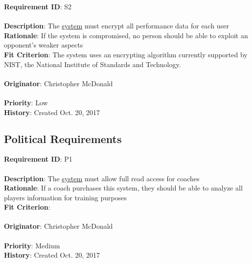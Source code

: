 \documentclass[11pt]{article}
\begin{document}
\begin{framed}
	\noindent\textbf{Requirement ID}: S2 \hfill\\\\
	\noindent\textbf{Description}: The \hyperref[sec:definitions]{system} must encrypt all performance data for each user \\
	\textbf{Rationale}: If the system is compromised, no person should be able to exploit an opponent's weaker aspects \\
	\textbf{Fit Criterion}: The system uses an encrypting algorithm currently supported by NIST, the National Institute of Standards and Technology.\\\\
	\textbf{Originator}: Christopher McDonald \\\\
	\textbf{Priority}: Low \hfill \\
	\noindent\textbf{History}: Created Oct. 20, 2017
\end{framed}

\subsection{Political Requirements}
\begin{framed}
	\noindent\textbf{Requirement ID}: P1\\\\
	\noindent\textbf{Description}: The \hyperref[sec:definitions]{system} must allow full read access for coaches \\
	\textbf{Rationale}: If a coach purchases this system, they should be able to analyze all players information for training purposes \\
	\textbf{Fit Criterion}: \\\\
	\textbf{Originator}: Christopher McDonald \\\\
	\textbf{Priority}: Medium \hfill \\
	\noindent\textbf{History}: Created Oct. 20, 2017
\end{framed}
\end{document}
